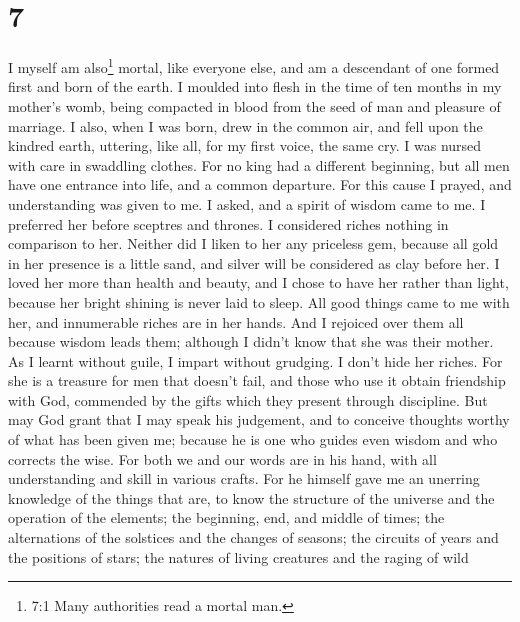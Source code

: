 \hypertarget{section-6}{%
\section{7}\label{section-6}}

 I myself am also\footnote{7:1 Many authorities read a
  mortal man.} mortal, like everyone else, and am a descendant of one
formed first and born of the earth.  I moulded into flesh in
the time of ten months in my mother's womb, being compacted in blood
from the seed of man and pleasure of marriage.  I also, when
I was born, drew in the common air, and fell upon the kindred earth,
uttering, like all, for my first voice, the same cry.  I was
nursed with care in swaddling clothes.  For no king had a
different beginning,  but all men have one entrance into
life, and a common departure.  For this cause I prayed, and
understanding was given to me. I asked, and a spirit of wisdom came to
me.  I preferred her before sceptres and thrones. I
considered riches nothing in comparison to her.  Neither did
I liken to her any priceless gem, because all gold in her presence is a
little sand, and silver will be considered as clay before her.
 I loved her more than health and beauty, and I chose to
have her rather than light, because her bright shining is never laid to
sleep.  All good things came to me with her, and
innumerable riches are in her hands.  And I rejoiced over
them all because wisdom leads them; although I didn't know that she was
their mother.  As I learnt without guile, I impart without
grudging. I don't hide her riches.  For she is a treasure
for men that doesn't fail, and those who use it obtain friendship with
God, commended by the gifts which they present through discipline.
 But may God grant that I may speak his judgement, and to
conceive thoughts worthy of what has been given me; because he is one
who guides even wisdom and who corrects the wise.  For both
we and our words are in his hand, with all understanding and skill in
various crafts.  For he himself gave me an unerring
knowledge of the things that are, to know the structure of the universe
and the operation of the elements;  the beginning, end, and
middle of times; the alternations of the solstices and the changes of
seasons;  the circuits of years and the positions of stars;
 the natures of living creatures and the raging of wild

